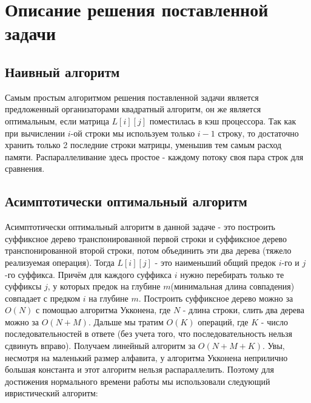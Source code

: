 \documentclass[12pt,a4paper]{article}
\begin{document}
\section{Описание решения поставленной задачи}
\subsection{Наивный алгоритм}
Самым простым алгоритмом решения поставленной задачи является предложенный организаторами квадратный алгоритм, он же является оптимальным, если матрица $L[i][j]$ поместилась в кэш процессора. Так как при вычислении $i$-ой строки мы используем только $i - 1$ строку, то достаточно хранить только 2 последние строки матрицы, уменьшив тем самым расход памяти. Распараллеливание здесь простое - каждому потоку своя пара строк для сравнения.

\subsection{Асимптотически оптимальный алгоритм}
Асимптотически оптимальный алгоритм в данной задаче - это построить суффиксное дерево транспонированной первой строки и суффиксное дерево транспонированной второй строки, потом объединить эти два дерева (тяжело реализуемая операция). Тогда $L[i][j]$ - это наименьший общий предок $i$-го и $j$-го суффикса. Причём для каждого суффикса $i$ нужно перебирать только те суффиксы $j$, у которых предок на глубине $m$(минимальная длина совпадения) совпадает с предком $i$ на глубине $m$. Построить суффиксное дерево можно за $O(N)$ с помощью алгоритма Укконена, где $N$ - длина строки, слить два дерева можно за $O(N+M)$. Дальше мы тратим $O(K)$ операций, где $K$ - число последовательностей в ответе (без учета того, что последовательность нельзя сдвинуть вправо).
Получаем линейный алгоритм за $O(N + M + K)$. Увы, несмотря на маленький размер алфавита, у алгоритма Укконена неприлично большая константа и этот алгоритм нельзя распараллелить. Поэтому для достижения нормального времени работы мы использовали следующий ивристический алгоритм:
\end{document}
